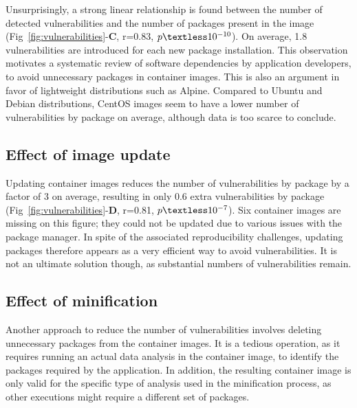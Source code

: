 \documentclass[a4paper,num-refs]{oup-contemporary}
\newcommand{\change}[2]{\color{cyan}Changes: #1\color{black}}
\begin{document}
Unsurprisingly, a strong linear relationship is found between the number of
detected vulnerabilities and the number of packages present in the
image (Fig~\ref{fig:vulnerabilities}-\textbf{C}, r=0.83,
$p\textless10^{-10}$). On average, 1.8 vulnerabilities are introduced for
each new package installation. This observation motivates a systematic
review of software dependencies by application developers, to avoid
unnecessary packages in container images. This is also an argument in favor of lightweight
distributions such as Alpine. Compared to Ubuntu and Debian distributions,
CentOS images seem to have a lower number of vulnerabilities by package on
average, although data is too scarce to conclude.

\subsection{Effect of image update}

Updating container images reduces the number of vulnerabilities by package
by a factor of 3 on average, resulting in only 0.6 extra vulnerabilities by
package (Fig~\ref{fig:vulnerabilities}-\textbf{D}, r=0.81,
$p\textless10^{-7}$). Six container images are missing on this figure; they
could not be updated due to various issues with the package manager.
In spite of the associated reproducibility challenges, updating
packages therefore appears as a very efficient way to avoid vulnerabilities. It
is not an ultimate solution though, as substantial numbers of
vulnerabilities remain.

\subsection{Effect of minification}

Another approach to reduce the number of vulnerabilities involves deleting
unnecessary packages from the container images. It is a tedious operation,
as it requires running an actual data analysis in the container image, to
identify the packages required by the application. In addition, the
resulting container image is only valid for the specific type of analysis
used in the minification process, as other executions might require a
different set of packages. 
\end{document}
